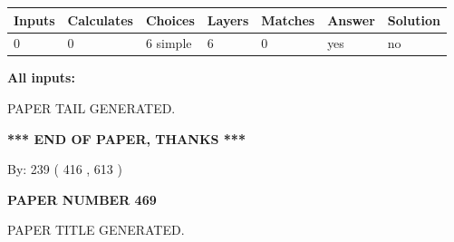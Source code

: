\documentclass[12pt]{article}
\begin{document}
   
\noindent\begin{tabular}{|l|l|l|l|l|l|l|}
 \hline
Inputs & Calculates & Choices & Layers & Matches & Answer & Solution \\ \hline
 0  & 
 0  & 
 6
  simple  
  & 
 6  & 
 0  & 
  yes & 
  no 
  \\ \hline
 \end{tabular}
   
   
   
   
\noindent{}
   
   
   
   
\noindent\vspace{0.1in}\hspace{-0.08in} {\textbf{\Large{All inputs: }}}
   
   
   
   
   
   
 \vspace{0.2in}
 
   
   
\vspace{2.0in} PAPER TAIL GENERATED.
   
   
   
   
\vspace{1.0in} 
{\textbf{\large{ *** END OF PAPER, THANKS *** }}} 
   
   
\hspace{1.0in} By: 
 239 ( 416 ,  613 )
   
   
   
   
\newpage 
\setcounter{page}{ 
   469001 } 
   
   
   
   
 {\textbf{ \Large{ PAPER NUMBER  469  }}}
   
   
\vspace{0.2in}
   
   
   
   
   
   
   
   
 \vspace{0.2in}
 
 
 
 
   
   
 PAPER TITLE GENERATED.
   
   
   
\vspace{0.2in}
   
\end{document}
